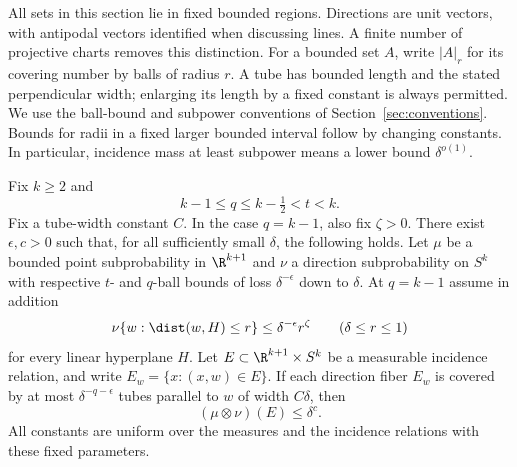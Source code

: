 All sets in this section lie in fixed bounded regions. Directions are unit
vectors, with antipodal vectors identified when discussing lines. A finite
number of projective charts removes this distinction. For a bounded set
$A$, write $|A|_r$ for its covering number by balls of radius $r$. A tube has
bounded length and the stated perpendicular width; enlarging its length by
a fixed constant is always permitted. We use the ball-bound and subpower
conventions of Section~\ref{sec:conventions}. Bounds for radii in a fixed
larger bounded interval follow by changing constants. In particular,
incidence mass at least subpower means a lower bound $\delta^{o(1)}$.


\begin{theorem}\label{ang:linear-gain}
Fix $k\ge2$ and
\[
 k-1\le q\le k-\tfrac12<t<k.
\]
Fix a tube-width constant $C$. In the case $q=k-1$, also fix
$\zeta>0$. There exist $\epsilon,c>0$ such that, for all sufficiently
small $\delta$, the following holds. Let $\mu$ be a bounded point
subprobability in $\R^{k+1}$ and $\nu$ a direction subprobability on $S^k$
with respective $t$- and $q$-ball bounds of loss $\delta^{-\epsilon}$
down to $\delta$. At $q=k-1$ assume in addition
\begin{equation}\label{ang:endpoint-plate}
 \nu\{w:\dist(w,H)\le r\}\le\delta^{-\epsilon}r^\zeta
       \qquad(\delta\le r\le1)
\end{equation}
for every linear hyperplane $H$. Let $E\subset\R^{k+1}\times S^k$ be a
measurable incidence relation, and write $E_w=\{x:(x,w)\in E\}$.
If each direction fiber $E_w$ is covered by at most
$\delta^{-q-\epsilon}$ tubes parallel to $w$ of width $C\delta$, then
\[
 (\mu\otimes\nu)(E)\le\delta^c.
\]
All constants are uniform over the measures and the incidence relations
with these fixed parameters.
\end{theorem}
